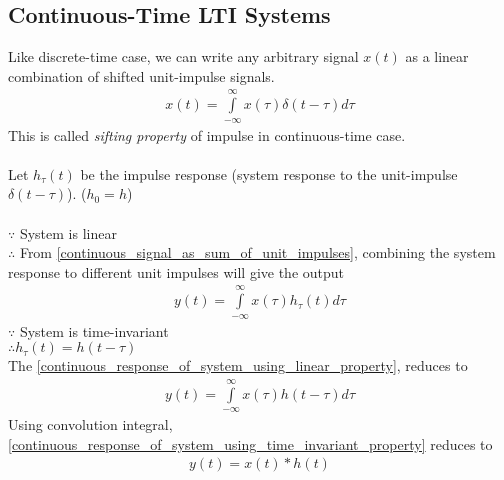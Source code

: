 \documentclass[oneside]{book}
\begin{document}
\subsection{Continuous-Time LTI Systems}
Like discrete-time case, we can write any arbitrary signal $x(t)$ as a linear combination of shifted unit-impulse signals.
\begin{align}
	x(t) = \int\limits_{-\infty}^{\infty}x(\tau)\delta(t - \tau)d\tau
	\label{continuous_signal_as_sum_of_unit_impulses}
\end{align}
This is called \textit{sifting property} of impulse in continuous-time case.
\\\\
\noindent Let $h_\tau(t)$ be the impulse response (system response to the unit-impulse $\delta(t - \tau)$). ($h_0 = h$)\\\\
\noindent\(\because\) System is linear\\
\(\therefore\) From \cref{continuous_signal_as_sum_of_unit_impulses}, combining the system response to different unit impulses will give the output
\begin{align}
	y(t) = \int\limits_{-\infty}^{\infty}x(\tau)h_\tau(t)d\tau
	\label{continuous_response_of_system_using_linear_property}
\end{align}
\noindent\(\because\) System is time-invariant\\
\(\therefore h_\tau(t) = h(t-\tau)\)\\
The \cref{continuous_response_of_system_using_linear_property}, reduces to
\begin{align}
	y(t) = \int\limits_{-\infty}^{\infty}x(\tau)h(t - \tau)d\tau
	\label{continuous_response_of_system_using_time_invariant_property}
\end{align}
Using convolution integral\cite{convolution_wiki}, \cref{continuous_response_of_system_using_time_invariant_property} reduces to
\begin{align*}
	y(t) = x(t)*h(t)
\end{align*}



\end{document}
